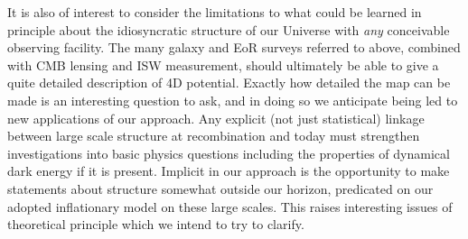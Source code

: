 \documentclass[psfig,12pt]{article}
\begin{document}
{%
It is also of interest to consider the limitations to what could be
learned in principle about the idiosyncratic structure of our Universe
with {\it any} conceivable observing facility. The many galaxy and EoR
surveys referred to above, combined with CMB lensing and ISW
measurement, should ultimately be able to give a quite detailed
description of 4D potential. Exactly how detailed the map can be made
is an interesting question to ask, and in doing so we anticipate being led
to new applications of our approach.
Any explicit
(not just statistical) linkage between large scale structure at
recombination and today must strengthen investigations into basic
physics questions including the properties of dynamical dark energy
if it is present. Implicit in our approach is the
opportunity to make statements about structure somewhat outside our
horizon, predicated on our adopted inflationary model on these large
scales. This raises interesting
issues of theoretical principle which we intend to try to clarify.







%
%
%

}
\end{document}
